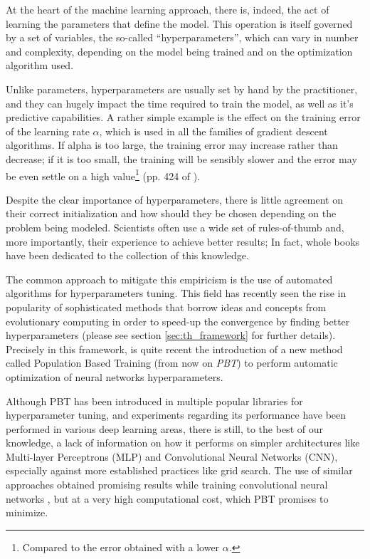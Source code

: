 \documentclass{article}
\begin{document}
	At the heart of the machine learning approach, there is, indeed, the act of learning the parameters that define the model. This operation is itself governed by a set of variables, the so-called ``hyperparameters'', which can vary in number and complexity, depending on the model being trained and on the optimization algorithm used.
	
	Unlike parameters, hyperparameters are usually set by hand by the practitioner, and they can hugely impact the time required to train the model, as well as it's predictive capabilities. A rather simple example is the effect on the training error of the learning rate $\alpha$, which is used in all the families of gradient descent algorithms. If alpha is too large, the training error may increase rather than decrease; if it is too small, the training will be sensibly slower and the error may be even settle on a high value\footnote{Compared to the error obtained with a lower $\alpha$.} (pp. 424 of \cite{Goodfellow-et-al-2016}).
	
	Despite the clear importance of hyperparameters, there is little agreement on their correct initialization and how should they be chosen depending on the problem being modeled. Scientists often use a wide set of rules-of-thumb and, more importantly, their experience to achieve better results; In fact, whole books have been dedicated to the collection of this knowledge\cite{DBLP:series/lncs/7700}.
	
	The common approach to mitigate this empiricism is the use of automated algorithms for hyperparameters tuning. This field has recently seen the rise in popularity of sophisticated methods that borrow ideas and concepts from evolutionary computing in order to speed-up the convergence by finding better hyperparameters (please see section \ref{sec:th_framework} for further details).
	Precisely in this framework, is quite recent the introduction of a new method called Population Based Training\cite{PBT} (from now on \emph{PBT}) to perform automatic optimization of neural networks hyperparameters.
	
	Although PBT has been introduced in multiple popular libraries for hyperparameter tuning\cite{Kim2018CHOPTA}\cite{Liang2018RayR}, and experiments regarding its performance have been performed in various deep learning areas\cite{PBT}, there is still, to the best of our knowledge, a lack of information on how it performs on simpler architectures like Multi-layer Perceptrons (MLP) and Convolutional Neural Networks (CNN), especially against more established practices like grid search. The use of similar approaches obtained promising results while training convolutional neural networks \cite{pmlr-v70-real17a}, but at a very high computational cost, which PBT promises to minimize.
	
\end{document}
